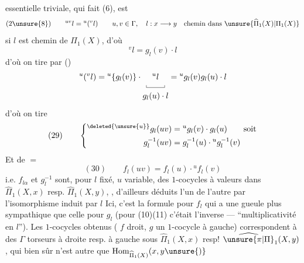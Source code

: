 essentielle triviale, qui fait   (6), est
\[
(2\unsure{8})\qquad {}^{uv}l={}^u({}^vl)
\qquad u,v\in\Gamma,\quad l:x\longrightarrow y
\quad\text{chemin dans }\unsure{\widehat{\Pi}_1(X)|\Pi_1(X)}
\]
 si $l$ est chemin de $\Pi_1(X)$, d'où
\[
{}^vl=g_l(v)\cdot l
\]
 d'où on tire par ()
\[
{}^u({}^vl)={}^u\{g_l(v)\}\cdot \underset{\begin{gathered}
\rule{0.35pt}{3pt}\rule{2.2em}{0.35pt}\rule{0.35pt}{3pt}\\[-2pt]
g_l(u)\cdot l
\end{gathered}}{{}^ul}={}^ug_l(v)g_l(u)\cdot l
\]
d'où on tire
\[
(29)\qquad\left\{\begin{aligned}
{}^{\deleted{\unsure{u}}}g_l(uv)&={}^ug_l(v)\cdot g_l(u)\qquad\text{soit}\\
g_l^{-1}(uv)&=g_l^{-1}(u)\cdot{}^ug_l^{-1}(v)
\end{aligned}\right.
\]
Et de $=$
\[
(30)\qquad f_l(uv)=f_l(u)\cdot{}^uf_l(v)
\]
i.e. $f_{l\alpha}$ et $g_l^{-1}$ sont, pour $l$ fixé, $u$ variable, des $1$-cocycles  à valeurs dans $\widehat{\Pi}_1(X,x)$ resp. $\widehat{\Pi}_1(X,y)$, , d'ailleurs déduits l'un de l'autre par l'isomorphisme
induit par $l$  Ici, c'est la formule pour $f_l$ qui a une gueule plus sympathique que celle pour $g_l$ (pour (10)(11) c'était l'inverse ---  ``multiplicativité en $l$''). Les $1$-cocycles obtenus ( $f$  droit, $g$ un $1$-cocycle à gauche) correspondent à des $\Gamma$ torseurs à droite resp. à gauche sous $\widehat{\Pi}_1(X,x)$ resp! $\widehat{\unsure{\pi|\Pi}}_1(X,y)$, qui bien sûr n'est autre que $\operatorname{Hom}_{\widehat{\Pi}_1(X)}(x,y\unsure{)}$

